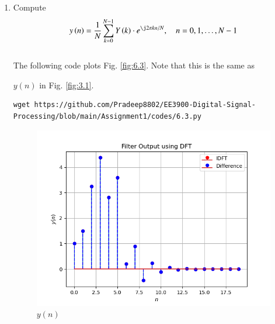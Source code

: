 \documentclass[journal,12pt,twocolumn]{IEEEtran}
\renewcommand\thesection{\arabic{section}}
\begin{document}
\begin{enumerate}[label=\thesection.\arabic*]
\item Compute
\begin{equation}
y\brak{n}={\frac {1}{N}}\sum _{k=0}^{N-1}Y\brak{k}\cdot e^{\j 2\pi kn/N},\quad n = 0,1,\dots, N-1
\end{equation}
\\
\solution The following code plots Fig. \ref{fig:6.3}. Note that this is the same as 

$y(n)$ in  Fig. 
\ref{fig:3.1}. 
%
\begin{lstlisting}
wget https://github.com/Pradeep8802/EE3900-Digital-Signal-Processing/blob/main/Assignment1/codes/6.3.py
\end{lstlisting}
\begin{figure}[!ht]
\centering
\includegraphics[width=\columnwidth]{./figs/6.3.png}
\caption{$y(n)$}
\label{fig:6.4}
\end{figure}
%
%
%

\end{enumerate}
\end{document}
